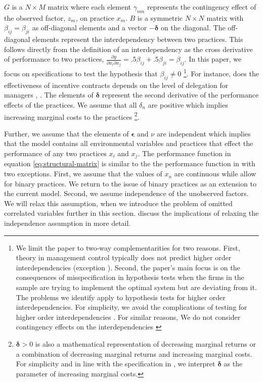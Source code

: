 \documentclass[12pt]{article}
\begin{document}
$G$ is a $N \times M$ matrix where each element $\gamma_{nm}$ represents the contingency effect of the observed factor, $z_m$, on practice $x_m$. $B$ is a symmetric $N \times N$ matrix with $\beta_{ij} = \beta_{ji}$ as off-diagonal elements and a vector $-\mathbf{\delta}$ on the diagonal. The off-diagonal elements represent the interdependency between two practices. This follows directly from the definition of an interdependency as the cross derivative of performance to two practices, $\frac{\partial y}{\partial x_i \partial x_j} = .5 \beta_{ij} + .5 \beta_{ji} = \beta_{ij}$. In this paper, we focus on specifications to test the hypothesis that $\beta_{ij} \neq 0$ \footnote{We limit the paper to two-way complementarities for two reasons. First, theory in management control typically does not predict higher order interdependencies (exception \citet{Aral2012}). Second, the paper's main focus is on the consequences of misspecification in hypothesis tests when the firms in the sample are trying to implement the optimal system but are deviating from it. The problems we identify apply to hypothesis tests for higher order interdependencies. For simplicity, we avoid the complications of testing for higher order interdependencies \citep{Carree2011}. For similar reasons, We do not consider contingency effects on the interdependencies \citep{Grabner2016,Matejka2017BalancingEvidence}}. For instance, does the effectiveness of incentive contracts depends on the level of delegation for managers \citep{Moers2006}, .  The elements of $\mathbf{\delta}$ represent the second derivative of the performance effects of the practices. We assume that all $\delta_n$ are positive which implies increasing marginal costs to the practices  \footnote{$\mathbf{\delta} > 0$ is also a mathematical representation of decreasing marginal returns or a combination of decreasing marginal returns and increasing marginal  costs. For simplicity and in line with the specification in \citet{Grabner2013}, we interpret $\mathbf{\delta}$ as the parameter of  increasing marginal costs.}. 

Further, we assume that the elements of $\mathbf{\epsilon}$ and $\nu$ are independent which implies that the model contains all environmental variables and practices that effect the performance of any two practices $x_i$ and $x_j$. The performance function in equation \eqref{eq:structural-matrix} is similar to the the performance function in \citet{Kretschmer2012} with two exceptions. First, we assume that the values of $x_n$ are continuous while \citet{Kretschmer2012} allow for binary practices. We return to the issue of binary practices as an extension to the current model. Second, we assume independence of the unobserved factors. We will relax this assumption, when we introduce the problem of omitted correlated variables further in this section. \citet{Athey1998} discuss the implications of relaxing the independence assumption in more detail. 
\end{document}
